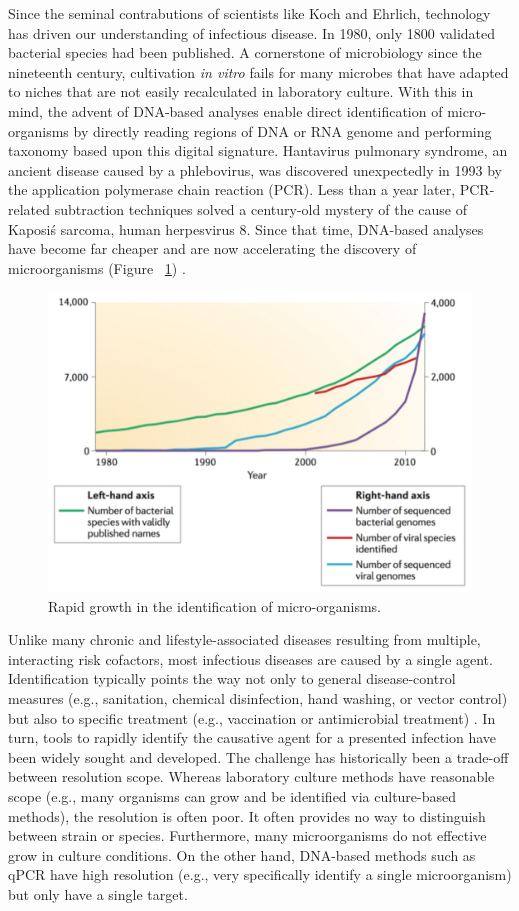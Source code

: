 Since the seminal contrabutions of scientists like Koch and Ehrlich, technology has driven our understanding of infectious disease. In 1980, only 1800 validated bacterial species had been published. A  cornerstone of microbiology since the nineteenth century, cultivation \emph{in vitro} fails for many microbes that have adapted to niches that are not easily recalculated in laboratory culture. With this in mind, the advent of DNA-based analyses enable direct identification of micro-organisms by directly reading regions of DNA or RNA genome and performing taxonomy based upon this digital signature. Hantavirus pulmonary syndrome, an ancient disease caused by a phlebovirus, was discovered unexpectedly in 1993 by the application polymerase chain reaction (PCR). Less than a year later, PCR-related subtraction techniques solved a century-old mystery of the cause of Kaposi\' s sarcoma, human herpesvirus 8. Since that time, DNA-based analyses have become far cheaper and are now accelerating the discovery of microorganisms (Figure ~\ref{fig:Fig1}) \cite{Fournier:2013ew}.

\begin{figure}
\center\includegraphics[width=120mm,scale=0.5]{Figures/Fig1}
\caption{Rapid growth in the identification of micro-organisms.}
\label{fig:Fig1}
\end{figure}

Unlike many chronic and lifestyle-associated diseases resulting from multiple, interacting risk cofactors, most infectious diseases are caused by a single agent. Identification typically points the way not only to general disease-control measures (e.g., sanitation, chemical disinfection, hand washing, or vector control) but also to specific treatment (e.g., vaccination or antimicrobial treatment) \cite{Fauci:2012us}. In turn, tools to rapidly identify the causative agent for a presented infection have been widely sought and developed. The challenge has historically been a trade-off between resolution scope. Whereas laboratory culture methods have reasonable scope (e.g., many organisms can grow and be identified via culture-based methods), the resolution is often poor. It often provides no way to distinguish between strain or species. Furthermore, many microorganisms do not effective grow in culture conditions. On the other hand, DNA-based methods such as qPCR have high resolution (e.g., very specifically identify a single microorganism) but only have a single target.

